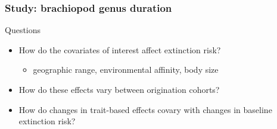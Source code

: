 \documentclass{beamer}
\begin{document}
\begin{frame}
  \frametitle{Study: brachiopod genus duration}

  \begin{alertblock}{Questions}
    \begin{itemize}
      \item How do the covariates of interest affect extinction risk?
        \begin{itemize}
          \item geographic range, environmental affinity, body size 
        \end{itemize}
      \item How do these effects vary between origination cohorts?
      \item How do changes in trait-based effects covary with changes in baseline extinction risk?
    \end{itemize}
  \end{alertblock}
\end{frame}
\end{document}

